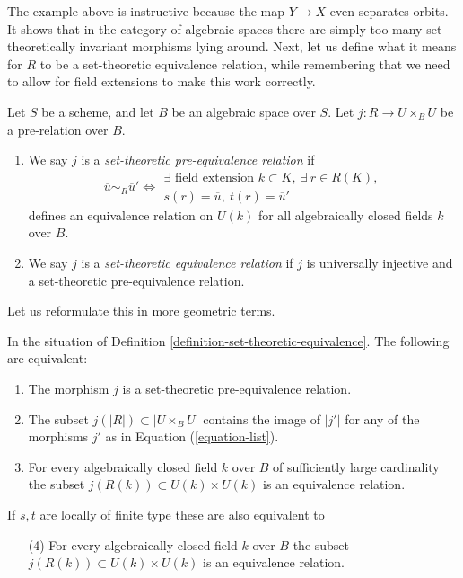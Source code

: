 \noindent
The example above is instructive because the map $Y \to X$ even separates
orbits. It shows that in the category of algebraic spaces there are simply
too many set-theoretically invariant morphisms lying around. Next, let us
define what it means for $R$ to be a set-theoretic equivalence relation, while
remembering that we need to allow for field extensions to make this work
correctly.

\begin{definition}
\label{definition-set-theoretic-equivalence}
Let $S$ be a scheme, and let $B$ be an algebraic space over $S$.
Let $j : R \to U \times_B U$ be a pre-relation over $B$.
\begin{enumerate}
\item We say $j$ is a {\it set-theoretic pre-equivalence relation} if
$$
\overline{u} \sim_R \overline{u}'
\Leftrightarrow
\begin{matrix}
\exists\text{ field extension }k \subset K, \ \exists\ r \in R(K), \\
s(r) = \overline{u}, \ t(r) = \overline{u}'
\end{matrix}
$$
defines an equivalence relation on $U(k)$ for all algebraically closed fields
$k$ over $B$.
\item We say $j$ is a {\it set-theoretic equivalence relation}
if $j$ is universally injective and a set-theoretic pre-equivalence
relation.
\end{enumerate}
\end{definition}

\noindent
Let us reformulate this in more geometric terms.

\begin{lemma}
\label{lemma-set-theoretic-pre-equivalence-geometric}
In the situation of Definition \ref{definition-set-theoretic-equivalence}.
The following are equivalent:
\begin{enumerate}
\item The morphism $j$ is a set-theoretic pre-equivalence relation.
\item The subset $j(|R|) \subset |U \times_B U|$ contains the image of
$|j'|$ for any of the morphisms $j'$ as in Equation (\ref{equation-list}).
\item For every algebraically closed field $k$ over $B$ of sufficiently large
cardinality the subset $j(R(k)) \subset U(k) \times U(k)$ is an equivalence
relation.
\end{enumerate}
If $s, t$ are locally of finite type these are also equivalent to
\begin{enumerate}
\item[(4)] For every algebraically closed field $k$ over $B$
the subset $j(R(k)) \subset U(k) \times U(k)$ is an equivalence relation.
\end{enumerate}
\end{lemma}

